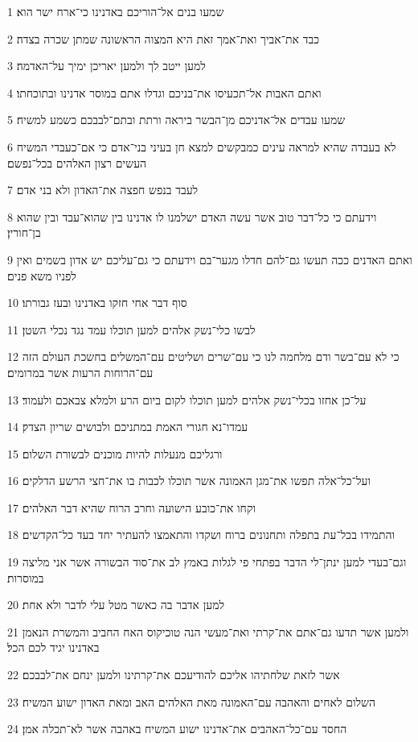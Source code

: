 \par 1 שמעו בנים אל־הוריכם באדנינו כי־ארח ישר הוא׃
\par 2 כבד את־אביך ואת־אמך זאת היא המצוה הראשונה שמתן שכרה בצדה׃
\par 3 למען ייטב לך ולמען יאריכן ימיך על־האדמה׃
\par 4 ואתם האבות אל־תכעיסו את־בניכם וגדלו אתם במוסר אדנינו ובתוכחתו׃
\par 5 שמעו עבדים אל־אדניכם מן־הבשר ביראה ורתת ובתם־לבבכם כשמע למשיח׃
\par 6 לא בעבדה שהיא למראה עינים כמבקשים למצא חן בעיני בני־אדם כי אם־כעבדי המשיח העשים רצון האלהים בכל־נפשם׃
\par 7 לעבד בנפש חפצה את־האדון ולא בני אדם׃
\par 8 וידעתם כי כל־דבר טוב אשר עשה האדם ישלמנו לו אדנינו בין שהוא־עבד ובין שהוא בן־חורין׃
\par 9 ואתם האדנים ככה תעשו גם־להם חדלו מגער־בם וידעתם כי גם־עליכם יש אדון בשמים ואין לפניו משא פנים׃
\par 10 סוף דבר אחי חזקו באדנינו ובעז גבורתו׃
\par 11 לבשו כלי־נשק אלהים למען תוכלו עמד נגד נכלי השטן׃
\par 12 כי לא עם־בשר ודם מלחמה לנו כי עם־שרים ושליטים עם־המשלים בחשכת העולם הזה עם־הרוחות הרעות אשר במרומים׃
\par 13 על־כן אחזו בכלי־נשק אלהים למען תוכלו לקום ביום הרע ולמלא צבאכם ולעמוד׃
\par 14 עמדו־נא חגורי האמת במתניכם ולבושים שריון הצדק׃
\par 15 ורגליכם מנעלות להיות מוכנים לבשורת השלום׃
\par 16 ועל־כל־אלה תפשו את־מגן האמונה אשר תוכלו לכבות בו את־חצי הרשע הדלקים׃
\par 17 וקחו את־כובע הישועה וחרב הרוח שהיא דבר האלהים׃
\par 18 והתמידו בכל־עת בתפלה ותחנונים ברוח ושקדו והתאמצו להעתיר יחד בעד כל־הקדשים׃
\par 19 וגם־בעדי למען ינתן־לי הדבר בפתחי פי לגלות באמץ לב את־סוד הבשורה אשר אני מליצה במוסרות׃
\par 20 למען אדבר בה כאשר מטל עלי לדבר ולא אחת׃
\par 21 ולמען אשר תדעו גם־אתם את־קרתי ואת־מעשי הנה טוכיקוס האח החביב והמשרת הנאמן באדנינו יגיד לכם הכל׃
\par 22 אשר לזאת שלחתיהו אליכם להודיעכם את־קרתינו ולמען ינחם את־לבבכם׃
\par 23 השלום לאחים והאהבה עם־האמונה מאת האלהים האב ומאת האדון ישוע המשיח׃
\par 24 החסד עם־כל־האהבים את־אדנינו ישוע המשיח באהבה אשר לא־תכלה אמן׃


